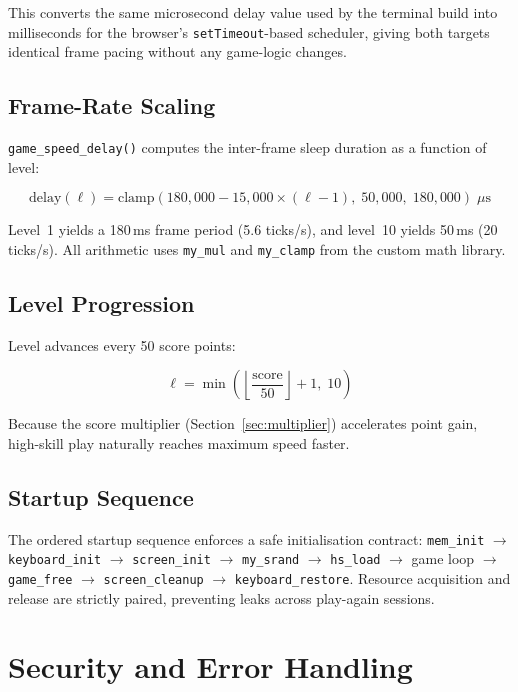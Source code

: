 \documentclass[conference]{IEEEtran}
\begin{document}
This converts the same microsecond delay value used by the terminal build into
milliseconds for the browser's \texttt{setTimeout}-based scheduler, giving
both targets identical frame pacing without any game-logic changes.

\subsection{Frame-Rate Scaling}

\texttt{game\_speed\_delay()} computes the inter-frame sleep duration as a
function of level:

\[
  \text{delay}(\ell) = \text{clamp}(180{,}000 - 15{,}000 \times (\ell - 1),\; 50{,}000,\; 180{,}000) \;\mu\text{s}
\]

Level~1 yields a 180\,ms frame period (5.6 ticks/s), and level~10 yields
50\,ms (20 ticks/s). All arithmetic uses \texttt{my\_mul} and \texttt{my\_clamp}
from the custom math library.

\subsection{Level Progression}

Level advances every 50 score points:

\[
  \ell = \min\!\left(\left\lfloor \frac{\text{score}}{50} \right\rfloor + 1,\; 10\right)
\]

Because the score multiplier (Section~\ref{sec:multiplier}) accelerates point
gain, high-skill play naturally reaches maximum speed faster.

\subsection{Startup Sequence}

The ordered startup sequence enforces a safe initialisation contract:
\texttt{mem\_init} $\to$ \texttt{keyboard\_init} $\to$ \texttt{screen\_init}
$\to$ \texttt{my\_srand} $\to$ \texttt{hs\_load} $\to$ game loop $\to$
\texttt{game\_free} $\to$ \texttt{screen\_cleanup} $\to$
\texttt{keyboard\_restore}. Resource acquisition and release are strictly
paired, preventing leaks across play-again sessions.

\section{Security and Error Handling}
\label{sec:security}
\end{document}
